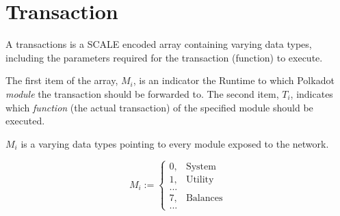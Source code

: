 \newpage
\section{Transaction}

A transactions is a SCALE encoded array containing varying data types, including
the parameters required for the transaction (function) to execute.
\newline

The first item of the array, $M_i$, is an indicator the Runtime to which
Polkadot \textit{module} the transaction should be forwarded to. The second
item, $T_i$, indicates which \textit{function} (the actual transaction) of the
specified module should be executed.
\newline

$M_i$ is a varying data types pointing to every module exposed to the network.

\[
M_i :=
\begin{cases}
0, & \text{System} \\
1, & \text{Utility} \\
... & \\
7, & \text{Balances} \\
... &
\end{cases}
\]
